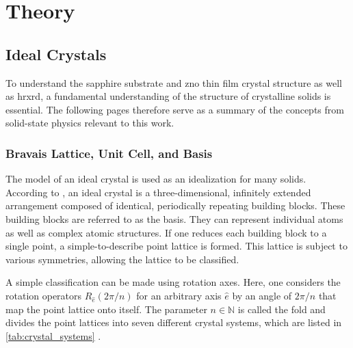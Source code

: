 \section{Theory}
\subsection{Ideal Crystals}\label{subsec:crystal_lattice}
To understand the sapphire substrate and \ac{zno} thin film crystal structure 
as well as \ac{hrxrd}, a fundamental understanding of the structure of crystalline solids 
is essential.
The following pages therefore serve as a summary of the concepts from solid-state physics relevant 
to this work.

\subsubsection{Bravais Lattice, Unit Cell, and Basis}
The model of an ideal crystal is used as an idealization for many solids.
According to , an ideal crystal is a three-dimensional, infinitely 
extended arrangement composed of identical, periodically repeating building blocks.
These building blocks are referred to as the basis.
They can represent individual atoms as well as complex atomic structures.
If one reduces each building block to a single point, a simple-to-describe point lattice is formed.
This lattice is subject to various symmetries, allowing the lattice to be classified.

A simple classification can be made using rotation axes.
Here, one considers the rotation operators $R_{\hat{e}}(2\pi / n)$ for an arbitrary axis $\hat{e}$ by
an angle of $2 \pi /n$ that map the point lattice onto itself.
The parameter $n \in \mathbb{N}$ is called the fold and divides the point lattices into seven different
crystal systems, which are listed in \cref{tab:crystal_systems} \autocite{Hunklinger}.

